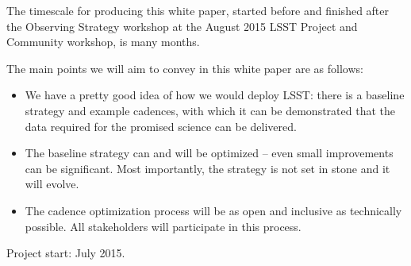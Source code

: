 \documentclass[11pt,headsepline,cleardoubleempty,twoside,openright]{scrbook}
\begin{document}
The timescale for producing this white paper, started before and
finished after the Observing Strategy workshop at the  August 2015
LSST Project and Community workshop, is many months.

The main points we will aim to convey in this white paper are as follows:

\begin{itemize}

    \item We have a pretty good idea of how we would deploy LSST:
    there is a baseline strategy and example cadences, with which it
    can be demonstrated that the data required for the promised
    science can be delivered.

    \item The baseline strategy can and will be optimized -- even small
    improvements can be significant. Most importantly, the strategy is
    not set in stone and it will evolve.

    \item The cadence optimization process will be as open and
    inclusive as technically possible. All stakeholders will
    participate in this process.

\end{itemize}

\raggedright{Project start: July 2015.}

































\end{document}
